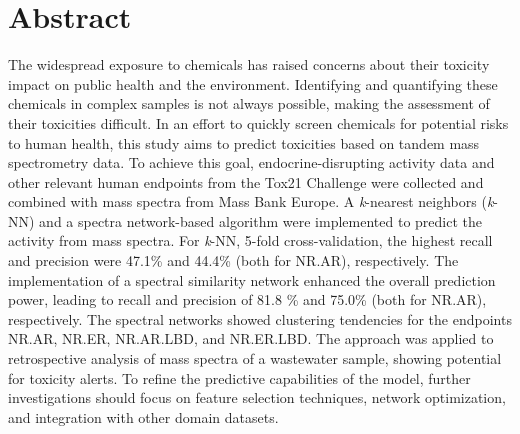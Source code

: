 \thispagestyle{plain}			%
\setlength{\parskip}{0pt plus 1.0pt}
\section*{Abstract}


The widespread exposure to chemicals has raised concerns about their toxicity impact on public health and the environment. Identifying and quantifying these chemicals in complex samples is not always possible, making the assessment of their toxicities difficult. In an effort to quickly screen chemicals for potential risks to human health, this study aims to predict toxicities based on tandem mass spectrometry \tMS{} data. To achieve this goal, endocrine-disrupting activity data and other relevant human endpoints from the Tox21 Challenge were collected and combined with mass spectra from Mass Bank Europe. A \textit{k}-nearest neighbors (\textit{k}-NN) and a spectra network-based algorithm were implemented to predict the activity from \tMS{} mass spectra. For \textit{k}-NN, 5-fold cross-validation, the highest recall and precision were 47.1\% and 44.4\% (both for NR.AR), respectively. The implementation of a spectral similarity network enhanced the overall prediction power, leading to recall and precision of 81.8 \% and 75.0\% (both for NR.AR), respectively. The spectral networks showed clustering tendencies for the endpoints NR.AR, NR.ER, NR.AR.LBD, and NR.ER.LBD. The approach was applied to retrospective analysis of \tMS{} mass spectra of a wastewater sample, showing potential for toxicity alerts. To refine the predictive capabilities of the model, further investigations should focus on feature selection techniques, network optimization, and integration with other domain datasets.
